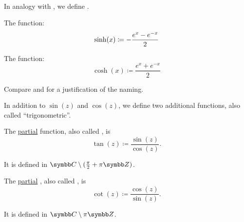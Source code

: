 \begin{definition}\label{def:hyperbolic_trigonometric_functions}
  In analogy with , we define .

  \begin{defenum}
     The  function:
    \begin{equation*}
      \sinh(x) \coloneqq - \frac {e^x - e^{-x}} 2 \\
    \end{equation*}

     The  function:
    \begin{equation*}
      \cosh(x) \coloneqq \frac {e^x + e^{-x}} 2
    \end{equation*}
  \end{defenum}

  Compare  and  for a justification of the naming.
\end{definition}

\begin{definition}\label{def:derived_trigonometric_functions}
  In addition to \( \sin(z) \) and \( \cos(z) \), we define two additional functions, also called \enquote{trigonometric}.

  \begin{defenum}
     The \hyperref[def:function/partial]{partial}  function, also called , is
    \begin{equation*}
      \tan(z) \coloneqq \frac {\sin(z)} {\cos(z)}.
    \end{equation*}

    It is defined in \( \BC \setminus (\tfrac \pi 2 + \pi\BZ) \).

     The \hyperref[def:function/partial]{partial} , also called , is
    \begin{equation*}
      \cot(z) \coloneqq \frac {\cos(z)} {\sin(z)}.
    \end{equation*}

    It is defined in \( \BC \setminus \pi\BZ \).
  \end{defenum}
\end{definition}

